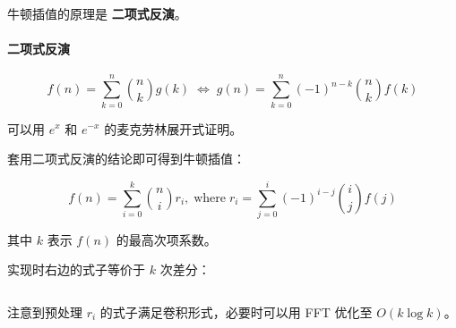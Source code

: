 牛顿插值的原理是 \textbf{二项式反演}。

\paragraph{二项式反演}

$$ f(n) = \sum_{k = 0} ^ n {n \choose k} g(k) \; \iff \; g(n) = \sum_{k = 0} ^ n \left( -1 \right) ^ {n - k} {n \choose k} f(k) $$

可以用 $e^x$ 和 $e^{-x}$ 的麦克劳林展开式证明。

套用二项式反演的结论即可得到牛顿插值：

$$ f(n) = \sum_{i = 0} ^ k {n \choose i} r_i , \; \text{where} \; r_i = \sum_{j = 0} ^ i (-1) ^ {i - j} {i \choose j} f(j) $$

其中 $k$ 表示 $f(n)$ 的最高次项系数。

实现时右边的式子等价于 $k$ 次差分：

\inputminted{cpp}{../src/math/牛顿插值.cpp}

注意到预处理 $r_i$ 的式子满足卷积形式，必要时可以用 FFT 优化至 $O(k\log k)$。
